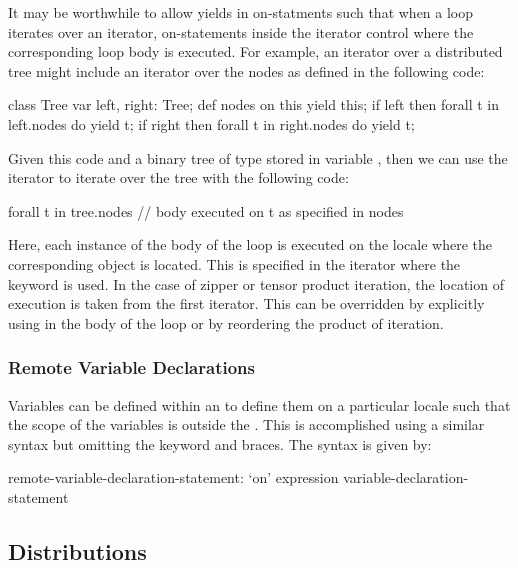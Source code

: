 \begin{openissue}
It may be worthwhile to allow yields in on-statments such that when a
loop iterates over an iterator, on-statements inside the iterator
control where the corresponding loop body is executed.  For example,
an iterator over a distributed tree might include an iterator over the
nodes as defined in the following code:
\begin{chapel}
class Tree {
  var left, right: Tree;
  def nodes {
    on this yield this;
    if left then
      forall t in left.nodes do
        yield t;
    if right then
      forall t in right.nodes do
        yield t;
  }
}
\end{chapel}
Given this code and a binary tree of type  stored in
variable , then we can use the  iterator to
iterate over the tree with the following code:
\begin{chapel}
forall t in tree.nodes {
  // body executed on t as specified in nodes
}
\end{chapel}
Here, each instance of the body of the  loop is executed
on the locale where the corresponding object  is located.
This is specified in the  iterator where the 
keyword is used.  In the case of zipper or tensor product iteration,
the location of execution is taken from the first iterator.  This can
be overridden by explicitly using  in the body of the loop or
by reordering the product of iteration.
\end{openissue}

\subsubsection{Remote Variable Declarations}
\label{remote_variable_declarations}

Variables can be defined within an  to define them
on a particular locale such that the scope of the variables is outside
the .  This is accomplished using a similar syntax
but omitting the  keyword and braces.  The syntax is given
by:
\begin{syntax}
remote-variable-declaration-statement:
  `on' expression variable-declaration-statement
\end{syntax}

\subsection{Distributions}
\label{Distributions}

